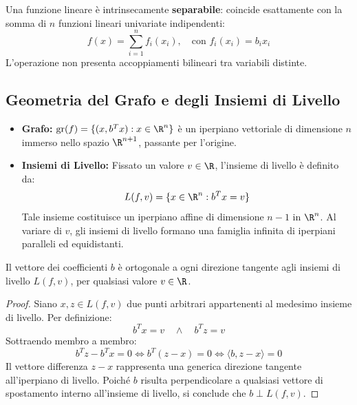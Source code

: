 Una funzione lineare \`e intrinsecamente \textbf{separabile}: coincide esattamente con la somma di $n$ funzioni lineari univariate indipendenti:
\begin{equation}
f(x) = \sum_{i=1}^n f_i(x_i), \quad \text{con } f_i(x_i) = b_i x_i
\end{equation}
L'operazione non presenta accoppiamenti bilineari tra variabili distinte.

\subsection{Geometria del Grafo e degli Insiemi di Livello}
\begin{itemize}
    \item \textbf{Grafo:} $\text{gr}(f) = \{(x, b^T x) : x \in \R^n\}$ \`e un iperpiano vettoriale di dimensione $n$ immerso nello spazio $\R^{n+1}$, passante per l'origine.
    \item \textbf{Insiemi di Livello:} Fissato un valore $v \in \R$, l'insieme di livello \`e definito da:
    \begin{equation}
    L(f, v) = \{x \in \R^n : b^T x = v\}
    \end{equation}
    Tale insieme costituisce un iperpiano affine di dimensione $n-1$ in $\R^n$. Al variare di $v$, gli insiemi di livello formano una famiglia infinita di iperpiani paralleli ed equidistanti.
\end{itemize}

\begin{theorem}
Il vettore dei coefficienti $b$ \`e ortogonale a ogni direzione tangente agli insiemi di livello $L(f, v)$, per qualsiasi valore $v \in \R$.
\end{theorem}

\begin{proof}
Siano $x, z \in L(f, v)$ due punti arbitrari appartenenti al medesimo insieme di livello. Per definizione:
\begin{equation}
b^T x = v \quad \land \quad b^T z = v
\end{equation}
Sottraendo membro a membro:
\begin{equation}
b^T z - b^T x = 0 \iff b^T (z - x) = 0 \iff \langle b, z - x \rangle = 0
\end{equation}
Il vettore differenza $z - x$ rappresenta una generica direzione tangente all'iperpiano di livello. Poich\'e $b$ risulta perpendicolare a qualsiasi vettore di spostamento interno all'insieme di livello, si conclude che $b \perp L(f, v)$.
\end{proof}


